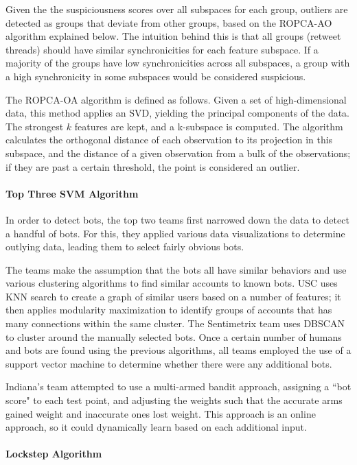 \documentclass[11pt, oneside]{article}   	%
\begin{document}
\quad Given the the suspiciousness scores over all subspaces for each group, outliers are detected as groups that deviate from other groups, based on the ROPCA-AO algorithm explained below.
The intuition behind this is that all groups (retweet threads) should have similar synchronicities for each feature subspace.
If a majority of the groups have low synchronicities across all subspaces, a group with a high synchronicity in some subspaces would be considered suspicious.

\quad The ROPCA-OA algorithm is defined as follows.
Given a set of high-dimensional data, this method applies an SVD, yielding the principal components of the data.
The strongest $k$ features are kept, and a k-subspace is computed.
The algorithm calculates the orthogonal distance of each observation to its projection in this subspace, and the distance of a given observation from a bulk of the observations; if they are past a certain threshold, the point is considered an outlier.

\paragraph{Top Three SVM Algorithm}

\quad In order to detect bots, the top two teams first narrowed down the data to detect a handful of bots.
For this, they applied various data visualizations to determine outlying data, leading them to select fairly obvious bots.

\quad The teams make the assumption that the bots all have similar behaviors and use various clustering algorithms to find similar accounts to known bots.
USC uses KNN search to create a graph of similar users based on a number of features; it then applies modularity maximization to identify groups of accounts that has many connections within the same cluster.
The Sentimetrix team uses DBSCAN to cluster around the manually selected bots.
Once a certain number of humans and bots are found using the previous algorithms, all teams employed the use of a support vector machine to determine whether there were any additional bots.

\quad Indiana's team attempted to use a multi-armed bandit approach, assigning a ``bot score" to each test point, and adjusting the weights such that the accurate arms gained weight and inaccurate ones lost weight.
This approach is an online approach, so it could dynamically learn based on each additional input.

\paragraph{Lockstep Algorithm}
\quad
\end{document}
